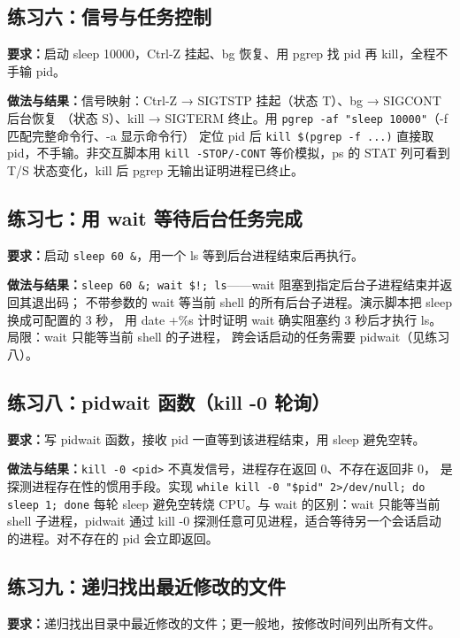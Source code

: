 \documentclass[UTF8]{ctexart}
\begin{document}
\subsection{练习六：信号与任务控制}

\noindent\textbf{要求：}启动 sleep 10000，Ctrl-Z 挂起、bg 恢复、用 pgrep 找 pid 再 kill，全程不手输 pid。

\noindent\textbf{做法与结果：}信号映射：Ctrl-Z → SIGTSTP 挂起（状态 T）、bg → SIGCONT 后台恢复
（状态 S）、kill → SIGTERM 终止。用 \texttt{pgrep -af "sleep 10000"}（-f 匹配完整命令行、-a 显示命令行）
定位 pid 后 \texttt{kill \$(pgrep -f ...)} 直接取 pid，不手输。非交互脚本用 \texttt{kill -STOP/-CONT}
等价模拟，ps 的 STAT 列可看到 T/S 状态变化，kill 后 pgrep 无输出证明进程已终止。

\subsection{练习七：用 wait 等待后台任务完成}

\noindent\textbf{要求：}启动 \texttt{sleep 60 \&}，用一个 ls 等到后台进程结束后再执行。

\noindent\textbf{做法与结果：}\texttt{sleep 60 \&; wait \$!; ls}——wait 阻塞到指定后台子进程结束并返回其退出码；
不带参数的 wait 等当前 shell 的所有后台子进程。演示脚本把 sleep 换成可配置的 3 秒，
用 date +\%s 计时证明 wait 确实阻塞约 3 秒后才执行 ls。局限：wait 只能等当前 shell 的子进程，
跨会话启动的任务需要 pidwait（见练习八）。

\subsection{练习八：pidwait 函数（kill -0 轮询）}

\noindent\textbf{要求：}写 pidwait 函数，接收 pid 一直等到该进程结束，用 sleep 避免空转。

\noindent\textbf{做法与结果：}\texttt{kill -0 <pid>} 不真发信号，进程存在返回 0、不存在返回非 0，
是探测进程存在性的惯用手段。实现 \texttt{while kill -0 "\$pid" 2>/dev/null; do sleep 1; done}
每轮 sleep 避免空转烧 CPU。与 wait 的区别：wait 只能等当前 shell 子进程，pidwait 通过 kill -0
探测任意可见进程，适合等待另一个会话启动的进程。对不存在的 pid 会立即返回。

\subsection{练习九：递归找出最近修改的文件}

\noindent\textbf{要求：}递归找出目录中最近修改的文件；更一般地，按修改时间列出所有文件。
\end{document}
